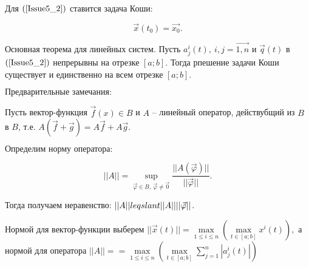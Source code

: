 Для $(\ref{Issue5_2})$ ставится задача Коши:

\[ \vec{x}(t_0) = \vec{x_0}.\]

\begin{theorem}

$\textbf{Основная теорема для линейных систем.}$ Пусть $a_j^i(t),\ i,j = \vec{1,n}$ и $\vec{q}(t)$ в $(\ref{Issue5_2})$ непрерывны на отрезке $[a;b]$. Тогда рпешение задачи Коши существует и единственно на всем отрезке $[a;b].$

\end{theorem}

$\textbf{Предварительные замечания:}$

Пусть вектор-функция $\vec{f}(x) \in B$ и $A$ -- линейный оператор, действубщий из $B$ в $B$, т.е. $A(\vec{f} + \vec{g}) = A\vec{f} + A\vec{g}$.

$\textbf{Определим норму оператора:}$

\[ ||A|| =  \sup\limits_{\vec{\varphi} \in B,\ \vec{\varphi} \neq \vec{0}} \frac{||A(\vec{\varphi})||}{||\vec{\varphi}||}. \]

Тогда получаем неравенство: $||A|| \\leqslant ||A||||\vec{\varphi}||$.

Нормой для вектор-функции выберем $||\vec{x}(t)|| = \max\limits_{1 \leqslant i \leqslant n} (\max\limits_{t \in [a;b]} x^i(t)),$ а нормой для оператора $||A|| = = \max\limits_{1 \leqslant i \leqslant n} (\max\limits_{t \in [a;b]} \sum\limits_{j = 1}^{n} |a_j^i(t)|)$

